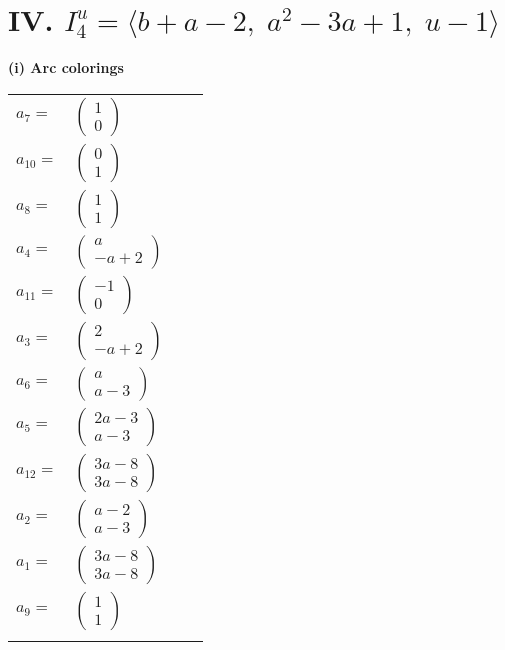 \documentclass[1p]{elsarticle_modified}
\theoremstyle{definition}
\begin{document}
\centering \section*{IV. $I^u_{4}= \langle b+a-2,\;a^2-3 a+1,\;u-1 \rangle$}
\flushleft \textbf{(i) Arc colorings}\\
\begin{tabular}{m{7pt} m{180pt} m{7pt} m{180pt} }
\flushright $a_{7}=$&$\begin{pmatrix}1\\0\end{pmatrix}$ \\
\flushright $a_{10}=$&$\begin{pmatrix}0\\1\end{pmatrix}$ \\
\flushright $a_{8}=$&$\begin{pmatrix}1\\1\end{pmatrix}$ \\
\flushright $a_{4}=$&$\begin{pmatrix}a\\- a+2\end{pmatrix}$ \\
\flushright $a_{11}=$&$\begin{pmatrix}-1\\0\end{pmatrix}$ \\
\flushright $a_{3}=$&$\begin{pmatrix}2\\- a+2\end{pmatrix}$ \\
\flushright $a_{6}=$&$\begin{pmatrix}a\\a-3\end{pmatrix}$ \\
\flushright $a_{5}=$&$\begin{pmatrix}2 a-3\\a-3\end{pmatrix}$ \\
\flushright $a_{12}=$&$\begin{pmatrix}3 a-8\\3 a-8\end{pmatrix}$ \\
\flushright $a_{2}=$&$\begin{pmatrix}a-2\\a-3\end{pmatrix}$ \\
\flushright $a_{1}=$&$\begin{pmatrix}3 a-8\\3 a-8\end{pmatrix}$ \\
\flushright $a_{9}=$&$\begin{pmatrix}1\\1\end{pmatrix}$\\&\end{tabular}
\end{document}
